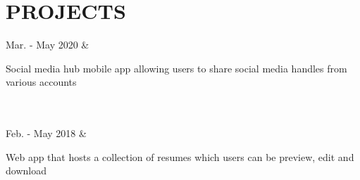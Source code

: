 \documentclass[]{richard-dang}
\begin{document}
\section*{PROJECTS}
\medbreak
\begin{tabularcv}
    Mar. - \newline 
    May 2020   &   
                    \href{https://github.com/Richard-Dang/socially}{
                    }
                    \begin{tabitemize}
                        \item Social media hub mobile app allowing users to share social media handles from various accounts
                    \end{tabitemize} 
                    \\[\vspacepar]\\[\vspacepar]
    Feb. - \newline 
    May 2018   &   
                    \href{https://github.com/Richard-Dang/FindMyResume}{
                    }
                    \begin{tabitemize}
                        \item Web app that hosts a collection of resumes which users can be preview, edit and download
                    \end{tabitemize} 
                    \\[\vspacepar]\\[\vspacepar]
\end{tabularcv}   

\end{document}
